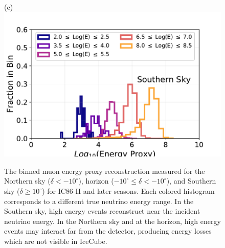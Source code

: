 \documentclass[aps,10pt,prd,twocolumn,floats,letterpaper,showpacs,nofootinbib,bibnotes,notitlepage,superscriptaddress,floatfix]{revtex4-1}
\begin{document}
\begin{figure}[t]
\begin{minipage}[c][3.5cm][c]{0.30\textwidth}
{(c)}\\\includegraphics[width=\linewidth]{./PublicReleasePlots/ReconstructionPlots/IC86-II/IC86_II_MC_esmearing_0.pdf}
\end{minipage}
\caption{The binned muon energy proxy reconstruction measured for the Northern sky ($\delta<-10^\circ$), horizon ($-10^\circ\leq\delta<-10^\circ$), and Southern sky ($\delta\geq 10^\circ$) for IC86-II and later seasons. Each colored histogram corresponds to a different true neutrino energy range. In the Southern sky, high energy events reconstruct near the incident neutrino energy. In the Northern sky and at the horizon, high energy events may interact far from the detector, producing energy losses which are not visible in IceCube. }\label{fig:ESmearing}
\end{figure}
\end{document}
